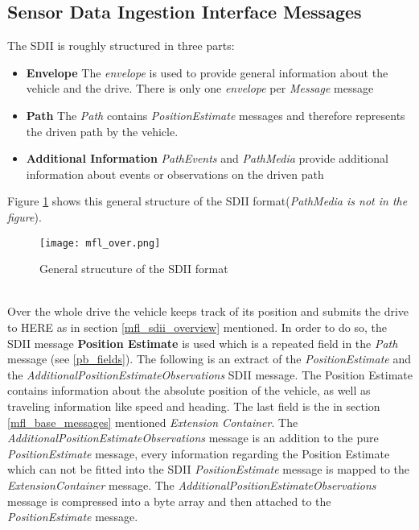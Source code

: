 \subsection{Sensor Data Ingestion Interface Messages}
\label{mfl_sdii_messages}
The SDII is roughly structured in three parts:
\begin{itemize}
\item \textbf{Envelope} The \emph{envelope} is used to provide general information about the vehicle and the drive. There is only one \emph{envelope} per \emph{Message} message
\item \textbf{Path} The \emph{Path} contains \emph{PositionEstimate} messages and therefore represents the driven path by the vehicle.
\item \textbf{Additional Information} \emph{PathEvents} and \emph{PathMedia} provide additional information about events or observations on the driven path
\end{itemize}
Figure \ref{mfl_sdii_over} shows this general structure of the SDII format(\emph{PathMedia is not in the figure}).
\begin{figure}[!hbt]
\texttt{[image: mfl\_over.png]}
\caption{General strucuture of the SDII format\cite{here_sdii}}
\label{mfl_sdii_over}
\end{figure}
\\Over the whole drive the vehicle keeps track of its position and submits the drive to HERE as in section \ref{mfl_sdii_overview} mentioned. In order to do so, the SDII message \textbf{Position Estimate} is used which is a repeated field in the \emph{Path} message (see \ref{pb_fields}). The following is an extract of the \emph{PositionEstimate} and the \emph{AdditionalPositionEstimateObservations} SDII message. The Position Estimate contains information about the absolute position of the vehicle, as well as traveling information like speed and heading. The last field is the in section \ref{mfl_base_messages} mentioned \emph{Extension Container}. The \emph{AdditionalPositionEstimateObservations} message is an addition to the pure \emph{PositionEstimate} message, every information regarding the Position Estimate which can not be fitted into the SDII \emph{PositionEstimate} message is mapped to the \emph{ExtensionContainer} message. The \emph{AdditionalPositionEstimateObservations} message is compressed into a byte array and then attached to the \emph{PositionEstimate} message.
